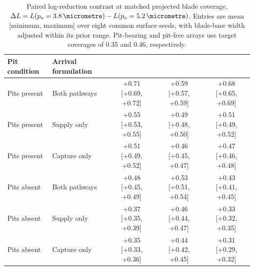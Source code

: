 \begin{table}[htbp]\centering\scriptsize
\caption{Paired log-reduction contrast at matched projected blade coverage, $\Delta L=L(p_a=3.8\,\si{\micrometre})-L(p_a=5.2\,\si{\micrometre})$. Entries are mean [minimum, maximum] over eight common surface seeds, with blade-base width adjusted within its prior range. Pit-bearing and pit-free arrays use target coverages of 0.35 and 0.46, respectively.}
\label{tab:geomcov}
\begin{tabular}{llccc}\toprule
Pit condition & Arrival formulation & \Ec{} & \Sa{} & \Pa{}\\\midrule
Pits present & Both pathways & +0.71 [+0.69, +0.72] & +0.59 [+0.57, +0.59] & +0.68 [+0.65, +0.69]\\
Pits present & Supply only & +0.55 [+0.53, +0.55] & +0.49 [+0.48, +0.50] & +0.51 [+0.49, +0.52]\\
Pits present & Capture only & +0.51 [+0.49, +0.52] & +0.46 [+0.45, +0.47] & +0.47 [+0.46, +0.48]\\
Pits absent & Both pathways & +0.48 [+0.45, +0.49] & +0.53 [+0.51, +0.54] & +0.43 [+0.41, +0.45]\\
Pits absent & Supply only & +0.37 [+0.35, +0.39] & +0.46 [+0.44, +0.47] & +0.33 [+0.32, +0.35]\\
Pits absent & Capture only & +0.35 [+0.33, +0.36] & +0.44 [+0.42, +0.45] & +0.31 [+0.29, +0.32]\\
\bottomrule\end{tabular}
\end{table}
